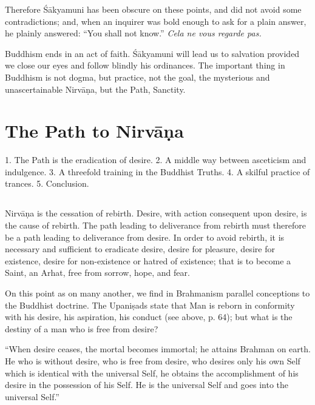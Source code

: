 \documentclass[a4paper, 11pt, oneside, english, landscape]{article}
\begin{document}
Therefore Śākyamuni has been obscure on these points, and did not avoid some contradictions; and, when an inquirer was bold enough to ask for a plain answer, he plainly answered: ``You shall not know.'' \emph{Cela ne vous regarde pas.}

Buddhism ends in an act of faith. Śākyamuni will lead us to salvation provided we close our eyes and follow blindly his ordinances. The important thing in Buddhism is not dogma, but practice, not the goal, the mysterious and unascertainable Nirvāṇa, but the Path, Sanctity.
\clearpage
\section{The Path to Nirvāṇa}
\begin{center}\footnotesize
1. The Path is the eradication of desire. 2. A middle way between asceticism and indulgence. 3. A threefold training in the Buddhist Truths. 4. A skilful practice of trances. 5. Conclusion.
\end{center}
\subsection{}
\paragraph{}
Nirvāṇa is the cessation of rebirth. Desire, with action consequent upon desire, is the cause of rebirth. The path leading to deliverance from rebirth must therefore be a path leading to deliverance from desire. In order to avoid rebirth, it is necessary and sufficient to eradicate desire, desire for pleasure, desire for existence, desire for non-existence or hatred of existence; that is to become a Saint, an Arhat, free from sorrow, hope, and fear.

On this point as on many another, we find in Brahmanism parallel conceptions to the Buddhist doctrine. The Upaniṣads state that Man is reborn in conformity with his desire, his aspiration, his conduct (see above, p. 64); but what is the destiny of a man who is free from desire?

``When desire ceases, the mortal becomes immortal; he attains Brahman on earth. He who is without desire, who is free from desire, who desires only his own Self which is identical with the universal Self, he obtains the accomplishment of his desire in the possession of his Self. He is the universal Self and goes into the universal Self.''
\end{document}
